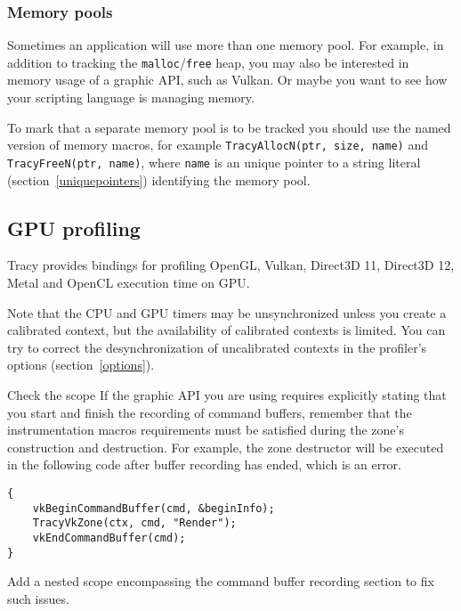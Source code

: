 \documentclass[hidelinks,titlepage,a4paper,twoside]{article}
\begin{document}
\subsubsection{Memory pools}
\label{memorypools}

Sometimes an application will use more than one memory pool. For example, in addition to tracking the \texttt{malloc}/\texttt{free} heap, you may also be interested in memory usage of a graphic API, such as Vulkan. Or maybe you want to see how your scripting language is managing memory.

To mark that a separate memory pool is to be tracked you should use the named version of memory macros, for example \texttt{TracyAllocN(ptr, size, name)} and \texttt{TracyFreeN(ptr, name)}, where \texttt{name} is an unique pointer to a string literal (section~\ref{uniquepointers}) identifying the memory pool.

\subsection{GPU profiling}
\label{gpuprofiling}

Tracy provides bindings for profiling OpenGL, Vulkan, Direct3D 11, Direct3D 12, Metal and OpenCL execution time on GPU.

Note that the CPU and GPU timers may be unsynchronized unless you create a calibrated context, but the availability of calibrated contexts is limited. You can try to correct the desynchronization of uncalibrated contexts in the profiler's options (section~\ref{options}).

\begin{bclogo}[
noborder=true,
couleur=black!5,
logo=\bclampe
]{Check the scope}
If the graphic API you are using requires explicitly stating that you start and finish the recording of command buffers, remember that the instrumentation macros requirements must be satisfied during the zone's construction and destruction. For example, the zone destructor will be executed in the following code after buffer recording has ended, which is an error.

\begin{lstlisting}
{
    vkBeginCommandBuffer(cmd, &beginInfo);
    TracyVkZone(ctx, cmd, "Render");
    vkEndCommandBuffer(cmd);
}
\end{lstlisting}

Add a nested scope encompassing the command buffer recording section to fix such issues.
\end{bclogo}
\end{document}
